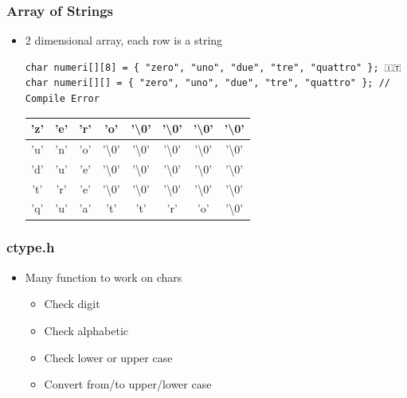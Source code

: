 \documentclass{../c-lecture}
\begin{document}
\begin{frame}[fragile]
  \frametitle{Array of Strings}
  \begin{itemize}
    \item 2 dimensional array, each row is a string
    \begin{verbatim}
char numeri[][8] = { "zero", "uno", "due", "tre", "quattro" }; 🇮🇹
char numeri[][] = { "zero", "uno", "due", "tre", "quattro" }; // Compile Error
    \end{verbatim}
    \begin{table}
    \begin{tabular}{*{8}{c}}
      \toprule
        'z' &
        'e' &
        'r' &
        'o' &
        '\textbackslash 0' &
        '\textbackslash 0' &
        '\textbackslash 0' &
        '\textbackslash 0' \\
      \midrule
        'u' &
        'n' &
        'o' &
        '\textbackslash 0' &
        '\textbackslash 0' &
        '\textbackslash 0' &
        '\textbackslash 0' &
        '\textbackslash 0' \\
      \midrule
        'd' &
        'u' &
        'e' &
        '\textbackslash 0' &
        '\textbackslash 0' &
        '\textbackslash 0' &
        '\textbackslash 0' &
        '\textbackslash 0' \\
      \midrule
        't' &
        'r' &
        'e' &
        '\textbackslash 0' &
        '\textbackslash 0' &
        '\textbackslash 0' &
        '\textbackslash 0' &
        '\textbackslash 0' \\
      \midrule
        'q' &
        'u' &
        'a' &
        't' &
        't' &
        'r' &
        'o' &
        '\textbackslash 0' \\
      \bottomrule
    \end{tabular}
    \end{table}
  \end{itemize}
\end{frame}

\begin{frame}
  \frametitle{ctype.h}
  \begin{itemize}
    \item Many function to work on chars
    \begin{itemize}
      \item Check digit
      \item Check alphabetic
      \item Check lower or upper case
      \item Convert from/to upper/lower case
    \end{itemize}
  \end{itemize}
\end{frame}
\end{document}
